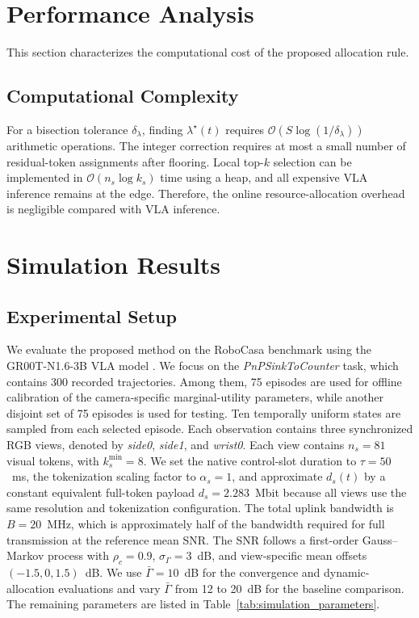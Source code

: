 \documentclass[lettersize,journal]{IEEEtran}
\theoremstyle{custom}
\begin{document}
\section{Performance Analysis}
This section characterizes the computational cost of the proposed allocation rule. 

\subsection{Computational Complexity}
For a bisection tolerance $\delta_\lambda$, finding $\lambda^\star(t)$ requires $\mathcal O(S\log(1/\delta_\lambda))$ arithmetic operations. The integer correction requires at most a small number of residual-token assignments after flooring. Local top-$k$ selection can be implemented in $\mathcal O(n_s\log k_s)$ time using a heap, and all expensive VLA inference remains at the edge. Therefore, the online resource-allocation overhead is negligible compared with VLA inference.

\section{Simulation Results}

\subsection{Experimental Setup}

We evaluate the proposed method on the RoboCasa benchmark
\cite{robocasa2024} using the GR00T-N1.6-3B VLA model
\cite{gr00tn1_2025}. We focus on the
\emph{PnPSinkToCounter} task, which contains 300 recorded
trajectories. Among them, 75 episodes are used for offline calibration
of the camera-specific marginal-utility parameters, while another
disjoint set of 75 episodes is used for testing. Ten temporally uniform
states are sampled from each selected episode. Each observation contains
three synchronized RGB views, denoted by \emph{side0}, \emph{side1},
and \emph{wrist0}. Each view contains $n_s=81$ visual tokens, with
$k_s^{\min}=8$. We set the native control-slot duration to
$\tau=50$~ms, the tokenization scaling factor to $\alpha_s=1$, and
approximate $d_s(t)$ by a constant equivalent full-token payload
$d_s=2.283$~Mbit because all views use the same resolution and
tokenization configuration. The total uplink bandwidth is
$B=20$~MHz, which is approximately half of the bandwidth required
for full transmission at the reference mean SNR. The SNR follows a
first-order Gauss--Markov process \cite{10195994}
with $\rho_c=0.9$, $\sigma_\Gamma=3$~dB, and view-specific mean
offsets $(-1.5,0,1.5)$~dB. We use $\bar{\Gamma}=10$~dB for the
convergence and dynamic-allocation evaluations and vary
$\bar{\Gamma}$ from 12 to 20~dB for the baseline comparison. The
remaining parameters are listed in Table~\ref{tab:simulation_parameters}.
\end{document}
